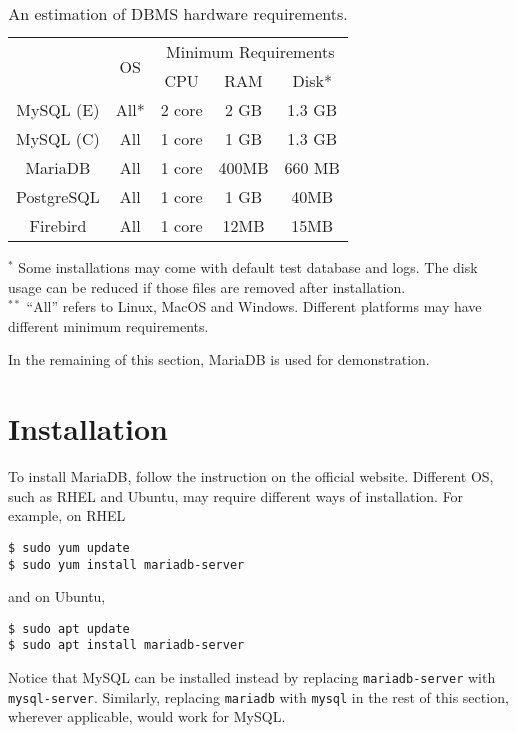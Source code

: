 \begin{table}
	\centering \caption{An estimation of DBMS hardware requirements.} \label{ch:db:tab:rdbrequirements}
	\begin{tabular}{|c|c|c|c|c|}
		\hline
		 & \multirow{2}{*}{OS} & \multicolumn{3}{c|}{Minimum Requirements} \\ \cline{3-5}
		 & & CPU & RAM & Disk* \\ \hline
		 MySQL (E) & All* & 2 core & 2 GB & 1.3 GB \\ \hline
		 MySQL (C) & All & 1 core & 1 GB & 1.3 GB \\ \hline
		 MariaDB & All & 1 core & 400MB & 660 MB \\ \hline
		 PostgreSQL & All & 1 core & 1 GB & 40MB \\ \hline
		 Firebird & All & 1 core & 12MB & 15MB \\ \hline
	\end{tabular}
	\begin{flushleft}
	\footnotesize
	$^{*}$ Some installations may come with default test database and logs. The disk usage can be reduced if those files are removed after installation. \\
	$^{**}$ ``All'' refers to Linux, MacOS and Windows. Different platforms may have different minimum requirements. \\
    \end{flushleft}
\end{table}

In the remaining of this section, MariaDB is used for demonstration.

\section{Installation}

To install MariaDB, follow the instruction on the official website. Different OS, such as RHEL and Ubuntu, may require different ways of installation. For example, on RHEL
\begin{lstlisting}
$ sudo yum update
$ sudo yum install mariadb-server
\end{lstlisting}
and on Ubuntu,
\begin{lstlisting}
$ sudo apt update
$ sudo apt install mariadb-server
\end{lstlisting}
Notice that MySQL can be installed instead by replacing \verb|mariadb-server| with \verb|mysql-server|. Similarly, replacing \verb|mariadb| with \verb|mysql| in the rest of this section, wherever applicable, would work for MySQL.

